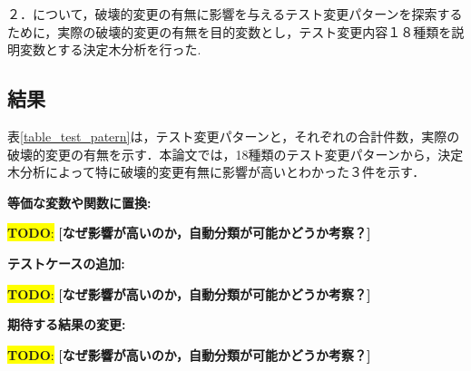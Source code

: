 \documentclass[uplatex,dvipdfmx,a4paper,twocolumn,base=11pt,jbase=11pt,ja=standard]{bxjsarticle}  %
\newcommand{\todo}[1]{\colorbox{yellow}{{\bf TODO}:}{\color{red} {\textbf{[#1]}}}}
\begin{document}
２．について，破壊的変更の有無に影響を与えるテスト変更パターンを探索するために，実際の破壊的変更の有無を目的変数とし，テスト変更内容１８種類を説明変数とする決定木分析を行った.

\subsection{結果}

表\ref{table_test_patern}は，テスト変更パターンと，それぞれの合計件数，実際の破壊的変更の有無を示す．本論文では，18種類のテスト変更パターンから，決定木分析によって特に破壊的変更有無に影響が高いとわかった３件を示す．

\noindent\textbf{等価な変数や関数に置換: }

\todo{なぜ影響が高いのか，自動分類が可能かどうか考察？}

\noindent\textbf{テストケースの追加: }

\todo{なぜ影響が高いのか，自動分類が可能かどうか考察？}

\noindent\textbf{期待する結果の変更: }

\todo{なぜ影響が高いのか，自動分類が可能かどうか考察？}



\begin{table*}[t]
  \caption{ライブラリテスト変更パターンの分類}
  \label{table_test_patern}
  \centering

\end{table*}
\end{document}
